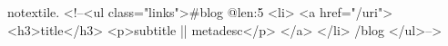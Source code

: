 notextile. <!--<ul class="links">{{#blog @{len:5} }}<li>
		<a href="/{{uri}}">
			<h3>{{title}}</h3>
			<p>{{subtitle || metadesc}}</p>
		</a>
	</li>
	{{/blog}}
</ul>-->
